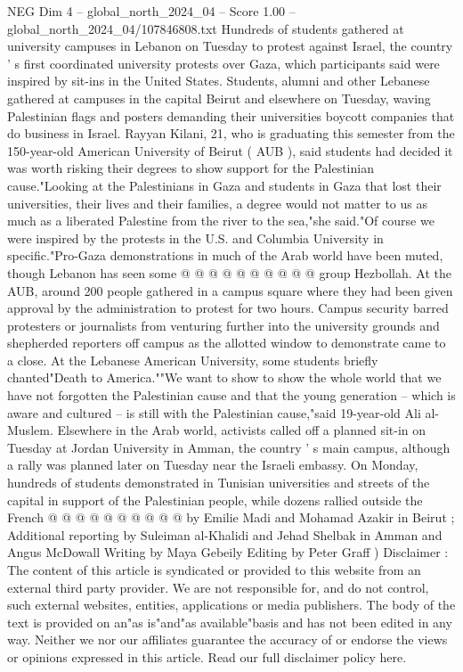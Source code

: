 \begin{textsample}{NEG Dim 4 – global\_north\_2024\_04 – Score 1.00 – global\_north\_2024\_04/107846808.txt}  \label{ex:f4_neg_095}
Hundreds of students gathered at university campuses in Lebanon on Tuesday to protest against Israel, the country ' s first coordinated university protests over Gaza, which participants said were inspired by sit-ins in the United States.
Students, alumni and other Lebanese gathered at campuses in the capital Beirut and elsewhere on Tuesday, waving Palestinian flags and posters demanding their universities boycott companies that do business in Israel.
Rayyan Kilani, 21, who is graduating this semester from the 150-year-old American University of Beirut ( AUB ), said students had decided it was worth risking their degrees to show support for the Palestinian cause."Looking at the Palestinians in Gaza and students in Gaza that lost their universities, their lives and their families, a degree would not matter to us as much as a liberated Palestine from the river to the sea,"she said."Of course we were inspired by the protests in the U.S. and Columbia University in specific."Pro-Gaza demonstrations in much of the Arab world have been muted, though Lebanon has seen some @ @ @ @ @ @ @ @ @ @ group Hezbollah.
At the AUB, around 200 people gathered in a campus square where they had been given approval by the administration to protest for two hours.
Campus security barred protesters or journalists from venturing further into the university grounds and shepherded reporters off campus as the allotted window to demonstrate came to a close.
At the Lebanese American University, some students briefly chanted"Death to America.""We want to show to show the whole world that we have not forgotten the Palestinian cause and that the young generation -- which is aware and cultured -- is still with the Palestinian cause,"said 19-year-old Ali al-Muslem.
Elsewhere in the Arab world, activists called off a planned sit-in on Tuesday at Jordan University in Amman, the country ' s main campus, although a rally was planned later on Tuesday near the Israeli embassy.
On Monday, hundreds of students demonstrated in Tunisian universities and streets of the capital in support of the Palestinian people, while dozens rallied outside the French @ @ @ @ @ @ @ @ @ @ by Emilie Madi and Mohamad Azakir in Beirut ; Additional reporting by Suleiman al-Khalidi and Jehad Shelbak in Amman and Angus McDowall Writing by Maya Gebeily Editing by Peter Graff ) Disclaimer : The content of this article is syndicated or provided to this website from an external third party provider.
We are not responsible for, and do not control, such external websites, entities, applications or media publishers.
The body of the text is provided on an"as is"and"as available"basis and has not been edited in any way.
Neither we nor our affiliates guarantee the accuracy of or endorse the views or opinions expressed in this article.
Read our full disclaimer policy here.

\end{textsample}
